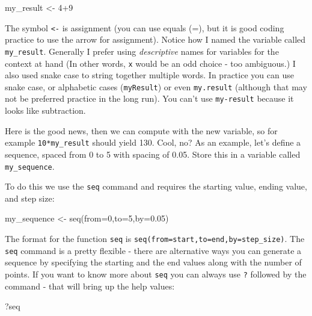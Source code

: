 \documentclass[
]{book}
\newenvironment{Shaded}{\begin{snugshade}}{\end{snugshade}}
\newcommand{\AttributeTok}[1]{\textcolor[rgb]{0.77,0.63,0.00}{#1}}
\newcommand{\DecValTok}[1]{\textcolor[rgb]{0.00,0.00,0.81}{#1}}
\newcommand{\FloatTok}[1]{\textcolor[rgb]{0.00,0.00,0.81}{#1}}
\newcommand{\FunctionTok}[1]{\textcolor[rgb]{0.00,0.00,0.00}{#1}}
\newcommand{\NormalTok}[1]{#1}
\newcommand{\OtherTok}[1]{\textcolor[rgb]{0.56,0.35,0.01}{#1}}
\newcommand{\SpecialCharTok}[1]{\textcolor[rgb]{0.00,0.00,0.00}{#1}}
\theoremstyle{definition}
\theoremstyle{definition}
\theoremstyle{definition}
\theoremstyle{remark}
\begin{document}
\begin{Shaded}
\begin{Highlighting}[]
\NormalTok{my\_result }\OtherTok{\textless{}{-}} \DecValTok{4}\SpecialCharTok{+}\DecValTok{9}
\end{Highlighting}
\end{Shaded}

The symbol \texttt{\textless{}-} is assignment (you can use equals (=), but it is good coding practice to use the arrow for assignment). Notice how I named the variable called \texttt{my\_result}. Generally I prefer using \emph{descriptive} names for variables for the context at hand (In other words, \texttt{x} would be an odd choice - too ambiguous.) I also used snake case to string together multiple words. In practice you can use snake case, or alphabetic cases (\texttt{myResult}) or even \texttt{my.result} (although that may not be preferred practice in the long run). You can't use \texttt{my-result} because it looks like subtraction.

Here is the good news, then we can compute with the new variable, so for example \texttt{10*my\_result} should yield 130. Cool, no? As an example, let's define a sequence, spaced from 0 to 5 with spacing of 0.05. Store this in a variable called \texttt{my\_sequence}.

To do this we use the \texttt{seq} command and requires the starting value, ending value, and step size:

\begin{Shaded}
\begin{Highlighting}[]
\NormalTok{my\_sequence }\OtherTok{\textless{}{-}} \FunctionTok{seq}\NormalTok{(}\AttributeTok{from=}\DecValTok{0}\NormalTok{,}\AttributeTok{to=}\DecValTok{5}\NormalTok{,}\AttributeTok{by=}\FloatTok{0.05}\NormalTok{)}
\end{Highlighting}
\end{Shaded}

The format for the function \texttt{seq} is \texttt{seq(from=start,to=end,by=step\_size)}. The \texttt{seq} command is a pretty flexible - there are alternative ways you can generate a sequence by specifying the starting and the end values along with the number of points. If you want to know more about \texttt{seq} you can always use \texttt{?} followed by the command - that will bring up the help values:

\begin{Shaded}
\begin{Highlighting}[]
\NormalTok{?seq}
\end{Highlighting}
\end{Shaded}
\end{document}
